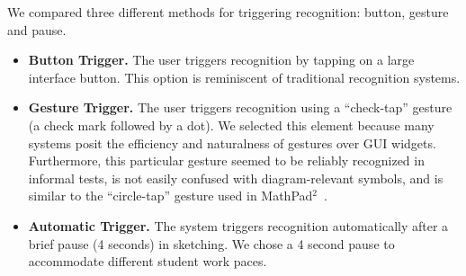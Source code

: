 \documentclass{egpubl}
\begin{document}
We compared three different methods for triggering recognition:
button, gesture and pause.

\begin{itemize}
\item \textbf{Button Trigger.}  The user triggers
recognition by tapping on a large interface button.  This 
option is reminiscent of traditional recognition systems.  
\item \textbf{Gesture Trigger.}  The user triggers
recognition using a ``check-tap'' gesture (a
check mark followed by a dot).  We selected this element because
many systems posit the efficiency and naturalness of gestures over 
GUI widgets.  Furthermore, this particular gesture seemed to be 
reliably recognized in informal tests, is not easily 
confused with diagram-relevant symbols,
and is similar to the ``circle-tap'' gesture used in
MathPad$^2$~\cite{LaViola2006Initial}.  
\item \textbf{Automatic Trigger.}  The system triggers recognition
automatically after a brief pause (4 seconds) in sketching.  We chose
a 4 second pause to accommodate different student work paces.
\end{itemize}




\end{document}
